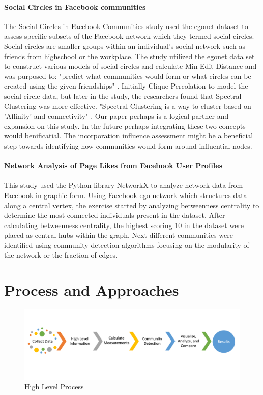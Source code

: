 \documentclass[11pt,twocolumn]{article}
\begin{document}
\paragraph{Social Circles in Facebook communities \cite{social-network-networkx}}   

The Social Circles in Facebook Communities study used the egonet dataset to assess specific subsets of the Facebook network which they termed social circles. Social circles are smaller groups within an individual's social network such as friends from highschool or the workplace. The study utilized the egonet data set to construct various models of social circles and calculate Min Edit Distance and was purposed to: "predict what communities would form or what circles can be created using the given friendships" \cite{social-network-networkx}. Initially Clique Percolation to model the social circle data, but later in the study, the researchers found that Spectral Clustering was more effective. "Spectral Clustering is a way to cluster based on 'Affinity' and connectivity" \cite{social-network-networkx}. Our paper perhaps is a logical partner and expansion on this study. In the future perhaps integrating these two concepts would benificatial. The incorporation influence assessment might be a beneficial step towards identifying how communities would form around influential nodes.

\paragraph{Network Analysis of Page Likes from Facebook User Profiles \cite{page-likes-facebook}}

This study used the Python library NetworkX to analyze network data from Facebook in graphic form. Using Facebook ego network which structures data along a central vertex, the exercise started by analyzing betweenness centrality to determine the most connected individuals present in the dataset. After calculating betweenness centrality, the highest scoring 10 in the dataset were placed as central hubs within the graph. Next different communities were identified using community detection algorithms focusing on the modularity of the network or the fraction of edges. 

\section{Process and Approaches}

\begin{figure}[hbt!]
\includegraphics[scale=0.2]{process_flow.PNG} 
\caption{High Level Process}
\end{figure}
\end{document}
